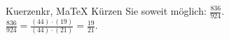 \begin{MAufgabe}{Kuerzen}{kr, MaTeX}
K\"urzen Sie soweit m\"oglich: $\frac{836}{924}$.\\ 
\ifLsg\MLoesung
\quad $\frac{836}{924}=\frac{(44)\cdot(19)}{(44)\cdot(21)}=\frac{19}{21}$.\else\relax\fi
 \end{MAufgabe}